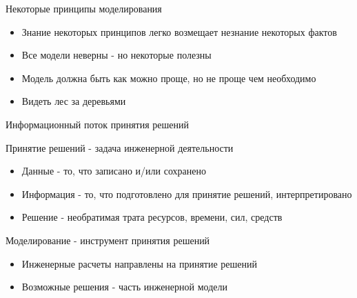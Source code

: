 \begin{frame}{Некоторые принципы моделирования}
    \begin{itemize}
        \item Знание некоторых принципов легко возмещает незнание некоторых фактов
        \item Все модели неверны - но некоторые полезны
        \item Модель должна быть как можно проще, но не проще чем необходимо
        \item Видеть лес за деревьями 
    \end{itemize}
\end{frame}

\begin{frame}{Информационный поток принятия решений}
\begin{center}
    

Принятие решений - задача инженерной деятельности
\end{center}
\begin{itemize}
    \item Данные - то, что записано и/или сохранено
    \item Информация - то, что подготовлено для принятие решений, интерпретировано
    \item Решение - необратимая трата ресурсов, времени, сил, средств
\end{itemize}{}

\end{frame}

\begin{frame}{Моделирование - инструмент принятия решений}
\begin{center}
    
\end{center}
\begin{itemize}
    \item Инженерные расчеты направлены на принятие решений
    \item Возможные решения - часть инженерной модели
\end{itemize}{}

\end{frame}

